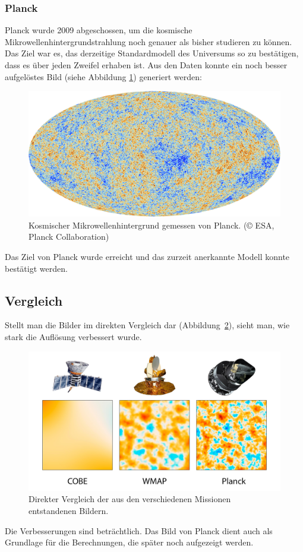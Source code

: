 \subsubsection{Planck}
Planck wurde 2009 abgeschossen, um die kosmische 
Mikrowellenhintergrundstrahlung noch genauer als bisher studieren zu können.
Das Ziel war es, das derzeitige Standardmodell des Universums so zu bestätigen, 
dass es über jeden Zweifel erhaben ist.
Aus den Daten konnte ein noch besser aufgelöstes Bild (siehe Abbildung 
\ref{fig:CMB_Planck}) generiert werden:
\begin{figure}
	\centering
	\includegraphics[width=\linewidth]{cmb/images/CMB_Planck.jpg}
	\caption{Kosmischer Mikrowellenhintergrund gemessen von Planck. (\copyright 
	ESA, Planck Collaboration)}
	\label{fig:CMB_Planck}
\end{figure}
Das Ziel von Planck wurde erreicht und das zurzeit anerkannte Modell konnte 
bestätigt werden.

\subsection{Vergleich}
Stellt man die Bilder im direkten Vergleich dar 
(Abbildung~\ref{fig:COBE_WMAP_PLANCK}), sieht man, wie stark die Auflösung 
verbessert wurde.
\begin{figure}
	\centering
	\includegraphics[width=\linewidth]{cmb/images/COBE_WMAP_Planck.jpg}
	\caption{Direkter Vergleich der aus den verschiedenen Missionen 
	entstandenen Bildern.}
	\label{fig:COBE_WMAP_PLANCK}
\end{figure}
Die Verbesserungen sind beträchtlich.
Das Bild von Planck dient auch als Grundlage für die Berechnungen, die später 
noch aufgezeigt werden.
